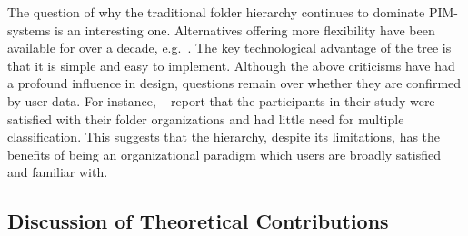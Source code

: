 The question of why the traditional folder hierarchy continues to dominate PIM-systems is an interesting one.  Alternatives offering more flexibility have been available for over a decade, e.g.~\citep{semanticfs:91}.  The key technological advantage of the tree is that it is simple and easy to implement.  Although the above criticisms have had a profound influence in design, questions remain over whether they are confirmed by user data.  For instance, ~\citet{bn:95} report that the participants in their study were satisfied with their folder organizations and had little need for multiple classification. This suggests that the hierarchy, despite its limitations, has the benefits of being an organizational paradigm which users are broadly satisfied and familiar with. %






\subsection{Discussion of Theoretical Contributions}
\label{theoretical-contribution-discussion}


